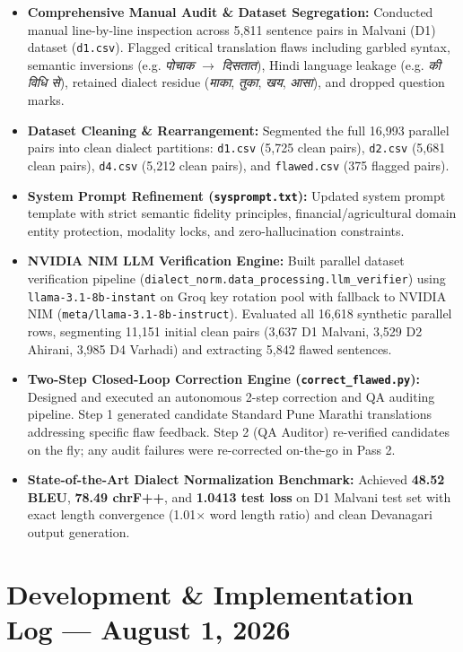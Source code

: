 \documentclass[10pt]{article}
\begin{document}
\begin{itemize}
  \item \textbf{Comprehensive Manual Audit \& Dataset Segregation:} Conducted manual line-by-line inspection across 5,811 sentence pairs in Malvani (D1) dataset (\texttt{d1.csv}). Flagged critical translation flaws including garbled syntax, semantic inversions (e.g. \textit{पोचाक} $\rightarrow$ \textit{दिसतात}), Hindi language leakage (e.g. \textit{की विधि से}), retained dialect residue (\textit{माका}, \textit{तुका}, \textit{खय}, \textit{आसा}), and dropped question marks.
  \item \textbf{Dataset Cleaning \& Rearrangement:} Segmented the full 16,993 parallel pairs into clean dialect partitions: \texttt{d1.csv} (5,725 clean pairs), \texttt{d2.csv} (5,681 clean pairs), \texttt{d4.csv} (5,212 clean pairs), and \texttt{flawed.csv} (375 flagged pairs).
  \item \textbf{System Prompt Refinement (\texttt{sysprompt.txt}):} Updated system prompt template with strict semantic fidelity principles, financial/agricultural domain entity protection, modality locks, and zero-hallucination constraints.
  \item \textbf{NVIDIA NIM LLM Verification Engine:} Built parallel dataset verification pipeline (\texttt{dialect\_norm.data\_processing.llm_verifier}) using \texttt{llama-3.1-8b-instant} on Groq key rotation pool with fallback to NVIDIA NIM (\texttt{meta/llama-3.1-8b-instruct}). Evaluated all 16,618 synthetic parallel rows, segmenting 11,151 initial clean pairs (3,637 D1 Malvani, 3,529 D2 Ahirani, 3,985 D4 Varhadi) and extracting 5,842 flawed sentences.
  \item \textbf{Two-Step Closed-Loop Correction Engine (\texttt{correct\_flawed.py}):} Designed and executed an autonomous 2-step correction and QA auditing pipeline. Step 1 generated candidate Standard Pune Marathi translations addressing specific flaw feedback. Step 2 (QA Auditor) re-verified candidates on the fly; any audit failures were re-corrected on-the-go in Pass 2.
  \item \textbf{State-of-the-Art Dialect Normalization Benchmark:} Achieved \textbf{48.52 BLEU}, \textbf{78.49 chrF++}, and \textbf{1.0413 test loss} on D1 Malvani test set with exact length convergence (1.01$\times$ word length ratio) and clean Devanagari output generation.
\end{itemize}

\section*{Development \& Implementation Log --- August 1, 2026}
\end{document}
